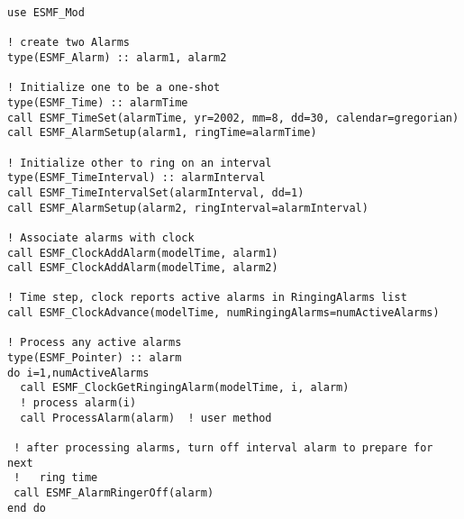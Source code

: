 
\begin{verbatim}
use ESMF_Mod

! create two Alarms
type(ESMF_Alarm) :: alarm1, alarm2

! Initialize one to be a one-shot
type(ESMF_Time) :: alarmTime
call ESMF_TimeSet(alarmTime, yr=2002, mm=8, dd=30, calendar=gregorian)
call ESMF_AlarmSetup(alarm1, ringTime=alarmTime)

! Initialize other to ring on an interval
type(ESMF_TimeInterval) :: alarmInterval
call ESMF_TimeIntervalSet(alarmInterval, dd=1)
call ESMF_AlarmSetup(alarm2, ringInterval=alarmInterval)

! Associate alarms with clock
call ESMF_ClockAddAlarm(modelTime, alarm1)
call ESMF_ClockAddAlarm(modelTime, alarm2)

! Time step, clock reports active alarms in RingingAlarms list
call ESMF_ClockAdvance(modelTime, numRingingAlarms=numActiveAlarms)

! Process any active alarms
type(ESMF_Pointer) :: alarm
do i=1,numActiveAlarms
  call ESMF_ClockGetRingingAlarm(modelTime, i, alarm)
  ! process alarm(i)
  call ProcessAlarm(alarm)  ! user method

 ! after processing alarms, turn off interval alarm to prepare for next
 !   ring time
 call ESMF_AlarmRingerOff(alarm)
end do
\end{verbatim}

